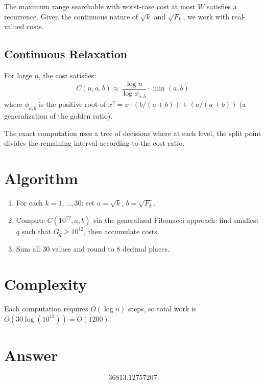 \documentclass[11pt]{article}
\begin{document}
The maximum range searchable with worst-case cost at most $W$ satisfies a recurrence.
Given the continuous nature of $\sqrt{k}$ and $\sqrt{F_k}$, we work with real-valued costs.

\subsection{Continuous Relaxation}

For large $n$, the cost satisfies:
\[
  C(n, a, b) \approx \frac{\log n}{\log \phi_{a,b}} \cdot \min(a, b)
\]
where $\phi_{a,b}$ is the positive root of $x^2 = x \cdot (b/(a+b)) + (a/(a+b))$
(a generalization of the golden ratio).

The exact computation uses a tree of decisions where at each level,
the split point divides the remaining interval according to the cost ratio.

\section{Algorithm}

\begin{enumerate}
  \item For each $k = 1, \ldots, 30$: set $a = \sqrt{k}$, $b = \sqrt{F_k}$.
  \item Compute $C(10^{12}, a, b)$ via the generalized Fibonacci approach:
    find smallest $q$ such that $G_q \ge 10^{12}$, then accumulate costs.
  \item Sum all 30 values and round to 8 decimal places.
\end{enumerate}

\section{Complexity}

Each computation requires $O(\log n)$ steps, so total work is $O(30 \log(10^{12})) = O(1200)$.

\section{Answer}

\[
\boxed{36813.12757207}
\]
\end{document}
